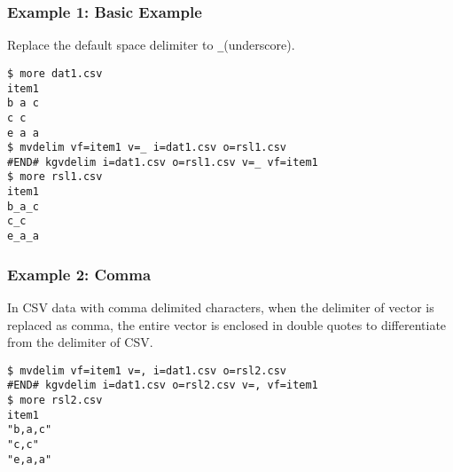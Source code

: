 \subsubsection*{Example 1: Basic Example}

Replace the default space delimiter to \verb|_|(underscore).


\begin{Verbatim}[baselinestretch=0.7,frame=single]
$ more dat1.csv
item1
b a c
c c
e a a
$ mvdelim vf=item1 v=_ i=dat1.csv o=rsl1.csv
#END# kgvdelim i=dat1.csv o=rsl1.csv v=_ vf=item1
$ more rsl1.csv
item1
b_a_c
c_c
e_a_a
\end{Verbatim}
\subsubsection*{Example 2: Comma}

In CSV data with comma delimited characters, when the delimiter of vector is replaced as comma, the entire vector is enclosed in double quotes to differentiate from the delimiter of CSV.


\begin{Verbatim}[baselinestretch=0.7,frame=single]
$ mvdelim vf=item1 v=, i=dat1.csv o=rsl2.csv
#END# kgvdelim i=dat1.csv o=rsl2.csv v=, vf=item1
$ more rsl2.csv
item1
"b,a,c"
"c,c"
"e,a,a"
\end{Verbatim}
